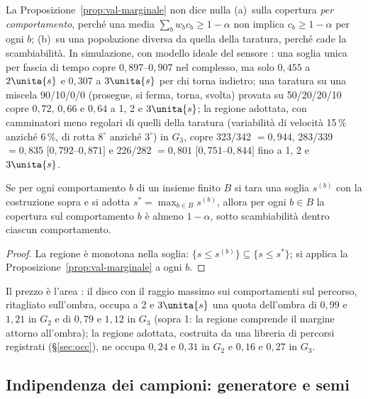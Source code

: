 \begin{osservazione}\label{oss:val-nonvale}
La Proposizione~\ref{prop:val-marginale} non dice nulla (a)~sulla copertura \emph{per comportamento}, perché una media $\sum_bw_bc_b\ge1-\alpha$ non implica $c_b\ge1-\alpha$ per ogni $b$; (b)~su una popolazione diversa da quella della taratura, perché cade la scambiabilità. In simulazione, con modello ideale del sensore : una soglia unica per fascia di tempo copre $0{,}897$–$0{,}907$ nel complesso, ma solo $0{,}455$ a $2\unita{s}$ e $0{,}307$ a $3\unita{s}$ per chi torna indietro; una taratura su una miscela 90/10/0/0 (prosegue, si ferma, torna, svolta) provata su 50/20/20/10 copre $0{,}72$, $0{,}66$ e $0{,}64$ a 1, 2 e $3\unita{s}$; la regione adottata, con camminatori meno regolari di quelli della taratura (variabilità di velocità 15\,\% anziché 6\,\%, di rotta $8^\circ$ anziché $3^\circ$) in $G_3$, copre 323/342 $=0{,}944$, 283/339 $=0{,}835$ $[0{,}792$–$0{,}871]$ e 226/282 $=0{,}801$ $[0{,}751$–$0{,}844]$ fino a 1, 2 e $3\unita{s}$.
\end{osservazione}

\begin{proposizione}\label{prop:val-pavimento}
Se per ogni comportamento $b$ di un insieme finito $B$ si tara una soglia $s^{(b)}$ con la costruzione sopra e si adotta $s^\ast=\max_{b\in B}s^{(b)}$, allora per ogni $b\in B$ la copertura sul comportamento $b$ è almeno $1-\alpha$, sotto scambiabilità dentro ciascun comportamento. 
\end{proposizione}
\begin{proof}
La regione è monotona nella soglia: $\{s\le s^{(b)}\}\subseteq\{s\le s^\ast\}$; si applica la Proposizione~\ref{prop:val-marginale} a ogni $b$.
\end{proof}
Il prezzo è l'area : il disco con il raggio massimo sui comportamenti sul percorso, ritagliato sull'ombra, occupa a 2 e $3\unita{s}$ una quota dell'ombra di $0{,}99$ e $1{,}21$ in $G_2$ e di $0{,}79$ e $1{,}12$ in $G_3$ (sopra 1: la regione comprende il margine attorno all'ombra); la regione adottata, costruita da una libreria di percorsi registrati (\S\ref{sec:occ}), ne occupa $0{,}24$ e $0{,}31$ in $G_2$ e $0{,}16$ e $0{,}27$ in $G_3$.

\subsection{Indipendenza dei campioni: generatore e semi}\label{sec:val-semi}

